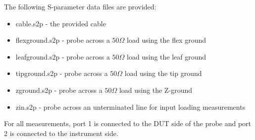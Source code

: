 \documentclass[11pt]{article}
\begin{document}
The following S-parameter data files are provided:
\begin{itemize}
\item cable.s2p - the provided cable
\item flexground.s2p - probe across a $50 \Omega$ load using the flex ground
\item leafground.s2p - probe across a $50 \Omega$ load using the leaf ground
\item tipground.s2p - probe across a $50 \Omega$ load using the tip ground
\item zground.s2p - probe across a $50 \Omega$ load using the Z-ground
\item zin.s2p - probe across an unterminated line for input loading measurements
\end{itemize}

For all measurements, port 1 is connected to the DUT side of the probe and port 2 is connected to the instrument side.
\end{document}

